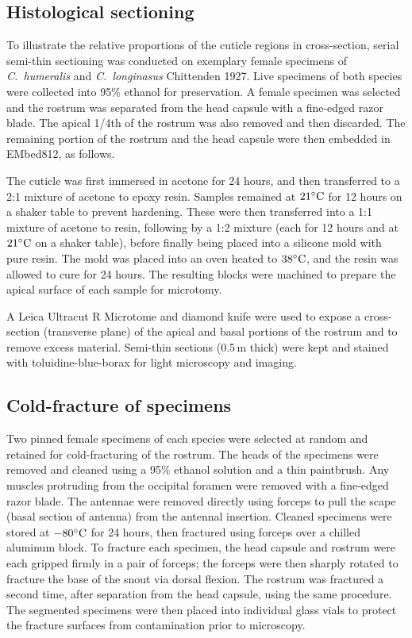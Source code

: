 \documentclass[twocolumn, linenumbers, superscriptaddress, nofootinbib]{revtex4-1}
\begin{document}
		\subsection*{Histological sectioning}
			To illustrate the relative proportions of the cuticle regions in cross-section, serial semi-thin sectioning was conducted on exemplary female specimens of \textit{C.~humeralis} and \textit{C.~longinasus} Chittenden 1927.
			Live specimens of both species were collected into 95\% ethanol for
			preservation.
			A female specimen was selected and the rostrum was separated from the head capsule with a fine-edged razor blade.
			The apical 1/4th of	the rostrum was also removed and then discarded.
			The remaining portion	of the rostrum and the head capsule were then embedded in EMbed812, as follows.
			
			The cuticle was first immersed in acetone for 24 hours, and then transferred to a 2:1 mixture of acetone to epoxy resin.
			Samples remained at $21\degree\text{C}$ for 12 hours on a shaker table to prevent hardening.
			These were then transferred into a 1:1 mixture of acetone to resin, following by a 1:2 mixture (each for 12 hours and at $21\degree\text{C}$ on a shaker table), before finally being placed into a silicone mold with pure resin.
			The mold was placed	into an oven heated to $38\degree\text{C}$, and the resin was allowed to cure for 24 hours.
			The resulting blocks were machined to prepare the apical surface of each
			sample for microtomy.
			
			A Leica Ultracut R Microtome and diamond knife were used to expose a cross-section (transverse plane) of the apical and basal portions of the rostrum and to remove excess material.
			Semi-thin sections (0.5\,{\textmu}m thick) were kept and stained with
			toluidine-blue-borax for light microscopy and imaging.
			
		\subsection*{Cold-fracture of specimens}
			Two pinned female specimens of each species were selected at random and retained for cold-fracturing of the rostrum.
			The heads of the specimens were removed and cleaned using a 95\% ethanol solution and a thin paintbrush.
			Any muscles protruding from the occipital foramen were removed with a fine-edged razor blade.
			The antennae were removed directly using forceps to pull the scape (basal section of antenna) from the antennal insertion.
			Cleaned specimens were stored at $-80\degree\text{C}$ for 24 hours, then fractured using forceps over a chilled aluminum block.
			To fracture each specimen, the head capsule and rostrum were each gripped firmly in a pair of forceps; the forceps were then sharply rotated to fracture the base of the snout via dorsal flexion.
			The rostrum was fractured a second time, after separation from the head capsule, using the same procedure.
			The segmented specimens were then placed into individual glass vials to protect the fracture surfaces from contamination prior to microscopy.
			
\end{document}
